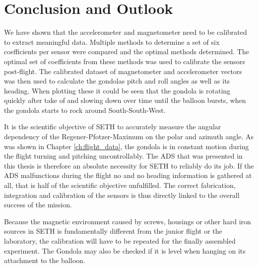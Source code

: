 \chapter{Conclusion and Outlook\label{ch:conclusion_outlook}}
We have shown that the accelerometer and magnetometer need to be calibrated to extract meaningful data. Multiple methods to determine a set of six coefficients per sensor were compared and the optimal methods determined. The optimal set of coefficients from these methods was used to calibrate the sensors post-flight. The calibrated dataset of magnetometer and accelerometer vectors was then used to calculate the gondolas pitch and roll angles as well as its heading. When plotting these it could be seen that the gondola is rotating quickly after take of and slowing down over time until the balloon bursts, when the gondola starts to rock around South-South-West.

It is the scientific objective of \ac{SETH} to accurately measure the angular dependency of the Regener-Pfotzer-Maximum on the polar and azimuth angle. As was shown in Chapter \ref{ch:flight_data}, the gondola is in constant motion during the flight turning and pitching uncontrollably. The \ac{ADS} that was presented in this thesis is therefore an absolute necessity for \ac{SETH} to reliably do its job. If the \ac{ADS} malfunctions during the flight no and no heading information is gathered at all, that is half of the scientific objective unfulfilled. The correct fabrication, integration and calibration of the sensors is thus directly linked to the overall success of the mission.
 

Because the magnetic environment caused by screws, housings or other hard iron sources in \ac{SETH} is fundamentally different from the junior flight or the laboratory, the calibration will have to be repeated for the finally assembled experiment. The Gondola may also be checked if it is level when hanging on its attachment to the balloon.